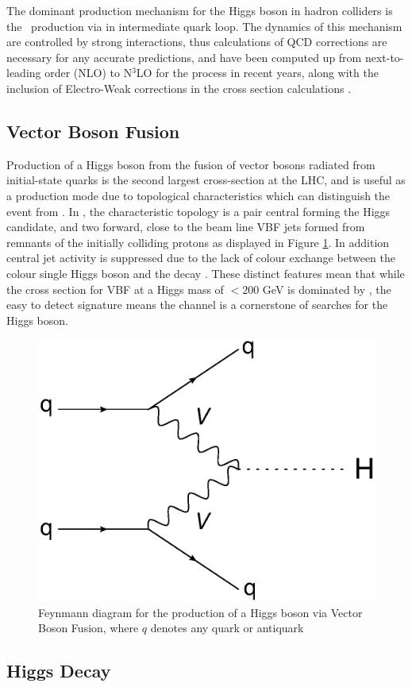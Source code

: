 		The dominant production mechanism for the Higgs boson in hadron colliders is the \ggF\, production via in intermediate quark loop. The dynamics of this mechanism are controlled by strong interactions, thus calculations of QCD corrections are necessary for any accurate predictions, and have been computed up from next-to-leading order (NLO) to N$^3$LO for the \ggF process in recent years, along with the inclusion of Electro-Weak corrections in the cross section calculations \cite{LHCHiggsCS}.

	\subsection{Vector Boson Fusion}
	\label{t:VBF}

		Production of a Higgs boson from the fusion of vector bosons radiated from initial-state quarks is the second largest cross-section at the LHC, and is useful as a production mode due to topological characteristics which can distinguish the event from \ggF. In \VBFHBB, the characteristic topology is a pair central \bjets forming the Higgs candidate, and two forward, close to the beam line VBF jets formed from remnants of the initially colliding protons as displayed in Figure \ref{fig:T:vbf}. In addition central jet activity is suppressed due to the lack of colour exchange between the colour single Higgs boson and the decay \bquarks \cite{VBF2004}.  These distinct features mean that while the cross section for VBF at a Higgs mass of $< 200$ GeV is dominated by \ggF, the easy to detect signature means the channel is a cornerstone of searches for the Higgs boson.

		\begin{figure}[h]
			\centering
			\includegraphics[width=0.4\linewidth]{T/FIGS/vbf}
			\caption{Feynmann diagram for the production of a Higgs boson via Vector Boson Fusion, where $q$ denotes any quark or antiquark}
			\label{fig:T:vbf}
		\end{figure}


	\subsection{Higgs Decay}

